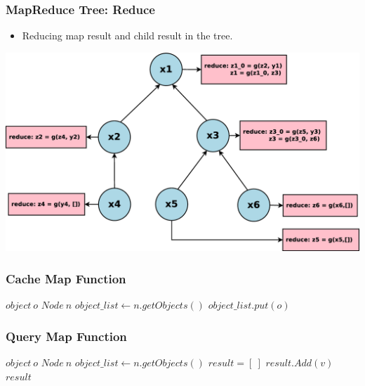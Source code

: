 \documentclass[red]{beamer}
\begin{document}
\begin{frame}
\frametitle{MapReduce Tree: Reduce}
\begin{itemize}
\item Reducing map result and child result in the tree.
\end{itemize}
\begin{center}
\includegraphics[scale=0.2]{figs/mapreduce_tree_reduce}
\end{center}
\end{frame}
\begin{frame}
\frametitle{Cache Map Function}
\begin{algorithmic}[1]
\REQUIRE $object~ o$     
\REQUIRE $Node~ n$
\STATE $object\_list \leftarrow n.getObjects()$ %
  \STATE $object\_list.put(o)$
  \RETURN \TRUE
\ELSE
  \RETURN \FALSE
\ENDIF
\end{algorithmic}
\end{frame}

\begin{frame}
\frametitle{Query Map Function}
\begin{algorithmic}[1]
\REQUIRE $object~ o$     
\REQUIRE $Node~ n$
\STATE $object\_list \leftarrow n.getObjects()$ %
\STATE $result = [~]$
    \STATE $result.Add(v)$
  \ENDIF
\ENDFOR
\RETURN $result$
\end{algorithmic}
\end{frame}

\end{document}
